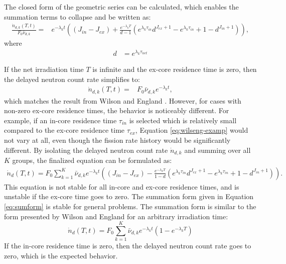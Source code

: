 The closed form of the geometric series can be calculated, which enables the summation terms to collapse and be written as:
\begin{align}
    \frac{\dot{n}_{d, k}(T, t)}{F_0 \bar{\nu}_{d, k}} =& e^{-\lambda_kt} \left( \left(J_{in}-J_{ex}\right) + \frac{e^{-\lambda_kT}}{d-1}  \left( e^{\lambda_k\tau_{in}}d^{J_{ex}+1} - e^{\lambda_k\tau_{in}} + 1 - d^{J_{in}+1} \right) \right),
\end{align}
where
\begin{align}
    d &= e^{\lambda_k\tau_{net}}
\end{align}

If the net irradiation time $T$ is infinite and the ex-core residence time is zero, then the delayed neutron count rate simplifies to:
\begin{align}
\dot{n}_{d, k}(T, t) =& F_0 \bar{\nu}_{d, k} e^{-\lambda_k t},
\label{eq:wilseng-examp}
\end{align}
which matches the result from Wilson and England \cite{wilson2002delayed}.
However, for cases with non-zero ex-core residence times, the behavior is noticeably different.
For example, if an in-core residence time $\tau_{in}$ is selected which is relatively small compared to the ex-core residence time $\tau_{ex}$, Equation \eqref{eq:wilseng-examp} would not vary at all, even though the fission rate history would be significantly different.
By isolating the delayed neutron count rate $\dot{n}_{d,k}$ and summing over all $K$ groups, the finalized equation can be formulated as:
\begin{align}
\dot{n}_{d}(T, t) =F_0 \sum_{k=1}^K \bar{\nu}_{d, k} e^{-\lambda_kt} \left( \left(J_{in}-J_{ex}\right) - \frac{e^{-\lambda_kT}}{1-d}  \left( e^{\lambda_k\tau_{in}}d^{J_{ex}+1} - e^{\lambda_k\tau_{in}} + 1 - d^{J_{in}+1} \right) \right).
\end{align}
This equation is not stable for all in-core and ex-core residence times, and is unstable if the ex-core time goes to zero.
The summation form given in Equation \eqref{eq:sumform} is stable for general problems.
The summation form is similar to the form presented by Wilson and England for an arbitrary irradiation time:
\begin{equation}
    \dot{n}_{d}(T, t) = F_0 \sum_{k=1}^K \bar{\nu}_{d, k} e^{-\lambda_k t} \left( 1 - e^{-\lambda_k T}\right)
\end{equation}
If the in-core residence time is zero, then the delayed neutron count rate goes to zero, which is the expected behavior.



